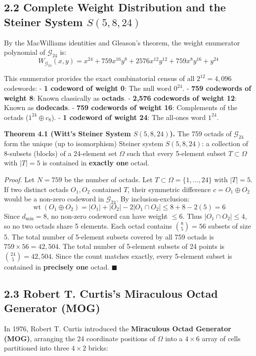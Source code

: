 \documentclass[11pt,twoside,openright]{amsbook}
\begin{document}
\subsection{2.2 Complete Weight Distribution and the Steiner System $S(5, 8, 24)$}

By the MacWilliams identities and Gleason's theorem, the weight enumerator polynomial of $\mathcal{G}_{24}$ is:
$$W_{\mathcal{G}_{24}}(x, y) = x^{24} + 759 x^{16} y^8 + 2576 x^{12} y^{12} + 759 x^8 y^{16} + y^{24}$$

This enumerator provides the exact combinatorial census of all $2^{12} = 4,096$ codewords:
- \textbf{1 codeword of weight 0}: The null word $0^{24}$.
- \textbf{759 codewords of weight 8}: Known classically as \textbf{octads}.
- \textbf{2,576 codewords of weight 12}: Known as \textbf{dodecads}.
- \textbf{759 codewords of weight 16}: Complements of the octads ($1^{24} \oplus c_8$).
- \textbf{1 codeword of weight 24}: The all-ones word $1^{24}$.

\textbf{Theorem 4.1 (Witt's Steiner System $S(5, 8, 24)$).}
The 759 octads of $\mathcal{G}_{24}$ form the unique (up to isomorphism) Steiner system $S(5, 8, 24)$: a collection of 8-subsets (blocks) of a 24-element set $\Omega$ such that every 5-element subset $T \subset \Omega$ with $|T| = 5$ is contained in \textbf{exactly one} octad.

\textit{Proof.} Let $N = 759$ be the number of octads. Let $T \subset \Omega = \{1, \dots, 24\}$ with $|T| = 5$.
If two distinct octads $O_1, O_2$ contained $T$, their symmetric difference $c = O_1 \oplus O_2$ would be a non-zero codeword in $\mathcal{G}_{24}$.
By inclusion-exclusion:
$$\operatorname{wt}(O_1 \oplus O_2) = |O_1| + |O_2| - 2|O_1 \cap O_2| \le 8 + 8 - 2(5) = 6$$
Since $d_{\min} = 8$, no non-zero codeword can have weight $\le 6$. Thus $|O_1 \cap O_2| \le 4$, so no two octads share 5 elements.
Each octad contains $\binom{8}{5} = 56$ subsets of size 5. The total number of 5-element subsets covered by all 759 octads is $759 \times 56 = 42,504$.
The total number of 5-element subsets of 24 points is $\binom{24}{5} = 42,504$.
Since the count matches exactly, every 5-element subset is contained in \textbf{precisely one} octad. $\blacksquare$

\subsection{2.3 Robert T. Curtis's Miraculous Octad Generator (MOG)}

In 1976, Robert T. Curtis introduced the \textbf{Miraculous Octad Generator (MOG)}, arranging the 24 coordinate positions of $\Omega$ into a $4 \times 6$ array of cells partitioned into three $4 \times 2$ bricks:
\end{document}
